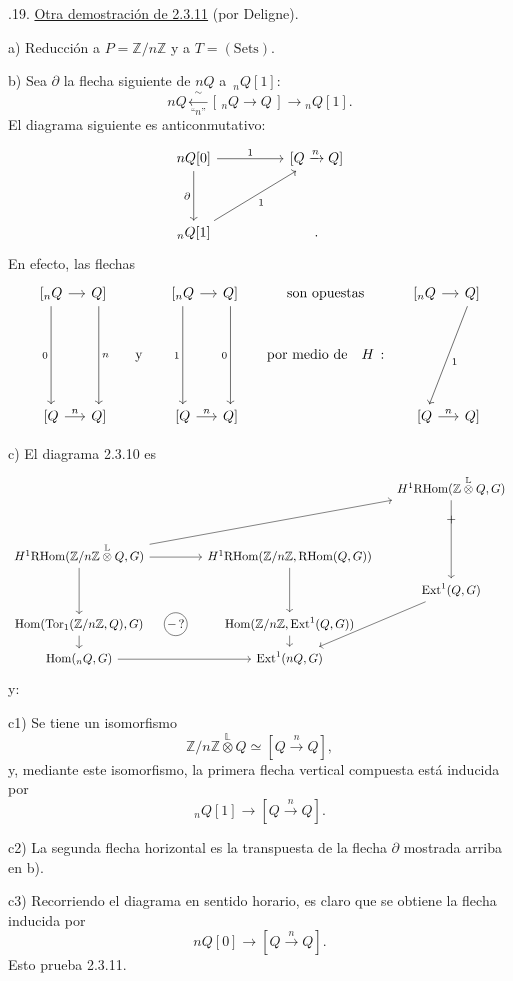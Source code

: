 \par\medskip
{}.19. \underline{Otra demostración de 2.3.11}
(por Deligne).

\medskip
\noindent a) Reducción a $P=\mathbb Z/n\mathbb Z$ y a
$T=(\mathrm{Sets})$.

\medskip
\noindent b) Sea $\partial$ la flecha siguiente de $nQ$ a
$\,{}_nQ[1]$:
\[
 nQ\xleftarrow[\text{``$n$''}]{\ \sim\ }
 [\,{}_nQ\longrightarrow Q\,]
 \longrightarrow{}_nQ[1].
\]
El diagrama siguiente es anticonmutativo:
\[
\begin{tikzcd}[row sep=huge,column sep=huge]
 nQ[\sisi{o}{0}]\arrow[r,"1"]\arrow[d,"\partial"']
   &{[Q\xrightarrow{n}Q]}\\
 {}_nQ[1]\arrow[ru,"1"']&{.}
\end{tikzcd}
\]
En efecto, las flechas
\[
\begin{tikzcd}[column sep=small,row sep=large]
 {[{}_nQ}\arrow[r]\arrow[dd,"0"']&{Q]}\arrow[dd,"n"]
   &&{[{}_nQ}\arrow[r]\arrow[dd,"1"']&{Q]}\arrow[dd,"0"']
   &\text{son opuestas}
   &{[{}_nQ}\arrow[r]&{Q]}\arrow[ddl,"1"]\\
 &&\text{y}&&&\text{por medio de}\quad H\,:&&\\
 {[Q}\arrow[r,"n"]&{Q]}&&{[Q}\arrow[r,"n"]&{Q]}
   &&{[Q}\arrow[r,"n"]&{Q]}
\end{tikzcd}
\]


\medskip
\noindent c) El diagrama 2.3.10 es
\[
\begin{tikzcd}[column sep=small,row sep=small]
 &&&H^1\mathrm{RHom}
   (\mathbb Z\mathbin{\overset{\mathbb L}{\otimes}}Q,G)
   \arrow[ddd]\\
 &&&+\\
 H^1\mathrm{RHom}
   (\mathbb Z/n\mathbb Z\mathbin{\overset{\mathbb L}{\otimes}}Q,G)
   \arrow[rr]\arrow[dd]\arrow[uurrr]
 &&H^1\mathrm{RHom}
   (\mathbb Z/n\mathbb Z,\mathrm{RHom}(Q,G))
   \arrow[dd]&\\
 &&&\mathrm{Ext}^1(Q,G)\arrow[ddl]\\
 \mathrm{Hom}(\mathrm{Tor}_1(\mathbb Z/n\mathbb Z,Q),G)\arrow[d]
 &|[draw,circle,inner sep=1pt]|{-\,?}
 &\mathrm{Hom}(\mathbb Z/n\mathbb Z,\mathrm{Ext}^1(Q,G))
   \arrow[d]&\\
 \mathrm{Hom}({}_nQ,G)\arrow[rr]
 &&\mathrm{Ext}^1(nQ,G)&
\end{tikzcd}
\]
y:

\smallskip
\noindent c1) Se tiene un isomorfismo
\[
 \mathbb Z/n\mathbb Z
 \mathbin{\overset{\mathbb L}{\otimes}}Q
 \simeq[Q\xrightarrow{n}Q],
\]
y, mediante este isomorfismo, la primera flecha vertical compuesta
está inducida por
\[
 {}_nQ[1]\longrightarrow[Q\xrightarrow{n}Q].
\]

\smallskip
\noindent c2) La segunda flecha horizontal es la transpuesta de la
flecha $\partial$ mostrada arriba en b).

\smallskip
\noindent c3) Recorriendo el diagrama en sentido horario, es claro que
se obtiene la flecha inducida por
\[
 nQ[0]\longrightarrow[Q\xrightarrow{n}Q].
\]
Esto prueba 2.3.11.
